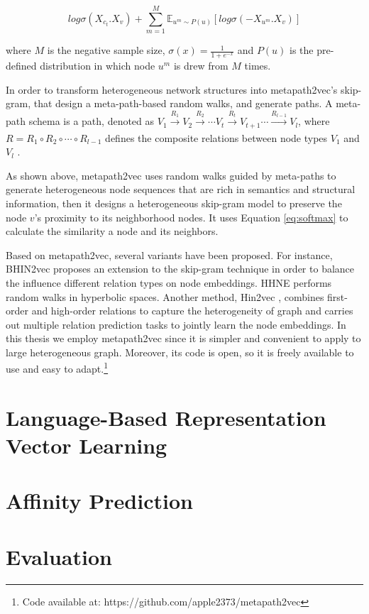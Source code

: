\begin{equation}
    log\sigma(X_{c_{t}}.X_{v}) + \sum_{m=1}^{M} \mathbb{E}_{u^{m}\sim P(u)}[log\sigma(-X_{u^{m}}.X_{v})]
\end{equation}

where $M$ is the negative sample size, $\sigma (x) = \frac{1}{1+e^{-x}}$ and $P(u)$ is the pre-defined distribution in which node $u^{m}$ is drew from $M$ times.

In order to transform heterogeneous network structures into metapath2vec's skip-gram, that design a meta-path-based random walks, and generate paths. A meta-path schema is a path, denoted as $V_{1} \xrightarrow[]{R_{1}} V_{2} \xrightarrow[]{R_{2}}\cdots V_{t} \xrightarrow[]{R_{t}} V_{t+1} \cdots \xrightarrow[]{R_{l-1}} V_{l}$, where $R = R_{1} \circ R_{2} \circ \cdots \circ R_{l-1}$ defines the composite relations between node types $V_{1}$ and $V_{l}$ \cite{sun2012mining}.

As shown above, metapath2vec uses random walks guided by meta-paths to generate heterogeneous node sequences that are rich in semantics and structural information, then it designs a heterogeneous skip-gram model to preserve the node $v$'s proximity to its neighborhood nodes. It uses Equation \ref{eq:softmax} to calculate the similarity a node and its neighbors.

Based on metapath2vec, several variants have been proposed. For instance, BHIN2vec \cite{lee2019bhin2vec} proposes an extension to the skip-gram technique in order to balance the influence different relation types on node embeddings. HHNE \cite{wang2019hyperbolic} performs random walks in hyperbolic spaces. Another method, Hin2vec \cite{fu2017hin2vec}, combines first-order and high-order relations to capture the heterogeneity of graph and carries out multiple relation prediction tasks to jointly learn the node embeddings. In this thesis we employ metapath2vec since it is simpler and convenient to apply to large heterogeneous graph. Moreover, its code is open, so it is freely available to use and easy to adapt.\footnote{Code available at: https://github.com/apple2373/metapath2vec}

\section{Language-Based Representation Vector Learning}

\section{Affinity Prediction}

\section{Evaluation}